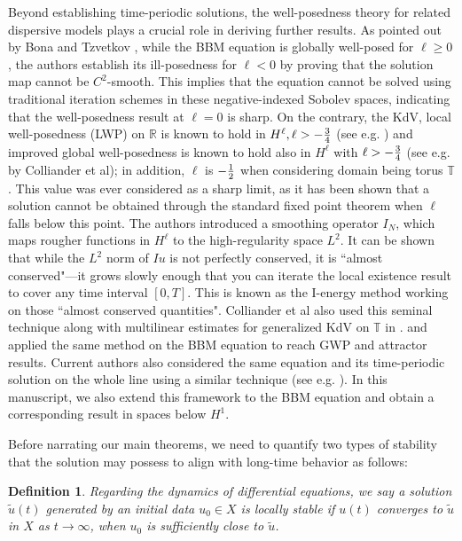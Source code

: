 \documentclass[10pt,a4paper,final]{article}
\numberwithin{equation}{section}
\newtheorem{definition}[theorem]{Definition}
\begin{document}
Beyond establishing time-periodic solutions, the well-posedness theory for related dispersive models plays a crucial role in deriving further results. As pointed out by Bona and Tzvetkov \cite{Tzvet}, while the BBM equation is globally well-posed for $\ell \ge 0$, the authors establish its ill-posedness for $\ell < 0$ by proving that the solution map cannot be $C^2$-smooth. This implies that the equation cannot be solved using traditional iteration schemes in these negative-indexed Sobolev spaces, indicating that the well-posedness result at $\ell = 0$ is sharp. On the contrary, the KdV, local well-posedness (LWP) on $\mathbb{R}$ is known to hold in $H^\ell, \ell>-{3\over 4}$ (see e.g. \cite{Bourgain, Kenig}) and improved global well-posedness is known to hold also in $H^\ell$ with $\ell > -{3\over 4}$ (see e.g. \cite{Tao1} by Colliander et al); in addition, $\ell$ is $-{1\over 2}$ when considering domain being torus $\mathbb{T}$. This value was ever considered as a sharp limit, as it has been shown that a solution cannot be obtained through the standard fixed point theorem when $\ell$ falls below this point. The authors introduced a smoothing operator $I_N$, which maps rougher functions in $H^\ell$ to the high-regularity space $L^2$. It can be shown that while the $L^2$ norm of $Iu$ is not perfectly conserved, it is ``almost conserved"—it grows slowly enough that you can iterate the local existence result to cover any time interval $[0, T]$. This is known as the I-energy method working on those ``almost conserved quantities". Colliander et al also used this seminal technique along with multilinear estimates for generalized KdV on $\mathbb{T}$ in \cite{Tao2}. \cite{Tzvet} and \cite{MWang2} applied the same method on the BBM equation to reach GWP and attractor results. Current authors also considered the same equation and its time-periodic solution on the whole line using a similar technique (see e.g. \cite{LW2}). In this manuscript, we also extend this framework to the BBM equation and obtain a corresponding result in spaces below $H^1$. 

Before narrating our main theorems, we need to quantify two types of stability that the solution may possess to align with long-time behavior as follows:

\begin{definition}\label{de2-2}
    Regarding the dynamics of differential equations, we say a solution $\tilde u(t)$ generated by an initial data $u_0\in X$ is locally stable if $u(t)$ converges to $\tilde u$ in $X$ as $t\rightarrow \infty$, when $u_0$ is sufficiently close to $\tilde u$.
\end{definition}
\end{document}

